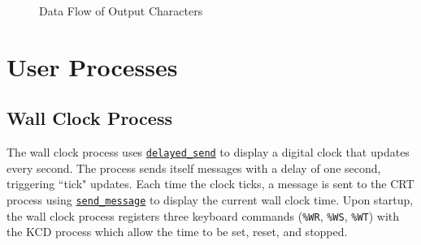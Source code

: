 \documentclass[12pt]{report}
\begin{document}
\begin{figure}
    
    \centering
    
    \caption{Data Flow of Output Characters}
    \label{fig:outputdataflow}
    
    \vspace{1em}
    
    
    \vspace{1em}
    
\end{figure}

\section{User Processes}

\subsection{Wall Clock Process}

The wall clock process uses \hyperref[alg:sendingdelayedmessages]{\texttt{delayed_send}} to display a digital clock that updates every second. The process sends itself messages with a delay of one second,
triggering ``tick" updates. Each time the clock ticks, a message is sent to the CRT process using \hyperref[alg:sendingmessages]{\texttt{send_message}} to display the current wall clock time. Upon startup, the wall clock process registers three keyboard commands (\texttt{\%WR}, \texttt{\%WS}, \texttt{\%WT}) with the KCD process which allow the time to be set, reset, and stopped.
\end{document}
